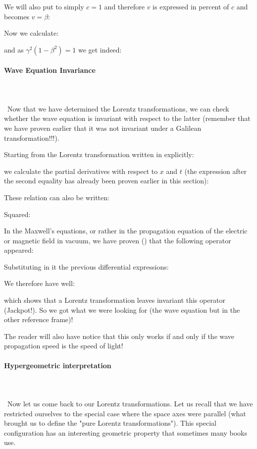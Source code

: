 	We will also put to simply $c=1$ and therefore $v$ is expressed in percent of $c$ and becomes $v=\beta$:
	
	Now we calculate:
	
	and as $\gamma^2(1-\beta^2)=1$ we get indeed:
	
	
	\paragraph{Wave Equation Invariance}\mbox{}\\\\\
	Now that we have determined the Lorentz transformations, we can check whether the wave equation is invariant with respect to the latter (remember that we have proven earlier that it was not invariant under a Galilean transformation!!!).
	
	Starting from the Lorentz transformation written in explicitly:
	
	we calculate the partial derivatives with respect to $x$ and $t$ (the expression after the second equality has already been proven earlier in this section):
	
	These relation can also be written:
	
	Squared:
	
	In the Maxwell's equations, or rather in the propagation equation of the electric or magnetic field in vacuum, we have proven () that the following operator appeared:
	
	Substituting in it the previous differential expressions:
	
	We therefore have well:
	
	which shows that a Lorentz transformation leaves invariant this operator (Jackpot!). So we got what we were looking for (the wave equation but in the other reference frame)!

	The reader will also have notice that this only works if and only if the wave propagation speed is the speed of light!

	\paragraph{Hypergeometric interpretation}\mbox{}\\\\\
	Now let us come back to our Lorentz transformations. Let us recall that we have restricted ourselves to the special case where the space axes were parallel (what brought us to define the "pure Lorentz transformations"). This special configuration has an interesting geometric property that sometimes many books use.

